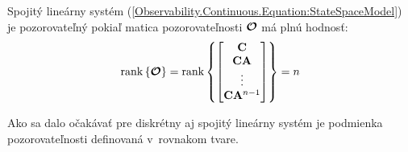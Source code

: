 \documentclass[a4paper, 10pt, ]{article}
\begin{document}
\begin{theorem}
    Spojitý lineárny systém (\ref{Observability.Continuous.Equation:StateSpaceModel}) je pozorovateľný pokiaľ matica pozorovateľnosti $\boldsymbol{\mathcal{O}}$ má plnú hodnosť:
    \begin{equation}
        \label{Observability.Continuous.Equation:ObservabilityTheorem}
        \mathrm{rank} \left\{ \boldsymbol{\mathcal{O}} \right\} = 
        \mathrm{rank} \left\{
            \begin{bmatrix}
                \mathbf{C}                \\
                \mathbf{C} \mathbf{A}         \\
                \vdots                \\
                \mathbf{C} \mathbf{A}^{n - 1} \\
            \end{bmatrix}
        \right\} = 
        n
    \end{equation}
\end{theorem}

Ako sa dalo očakávať pre diskrétny aj spojitý lineárny systém je podmienka pozorovateľnosti definovaná v~rovnakom tvare.
\end{document}
